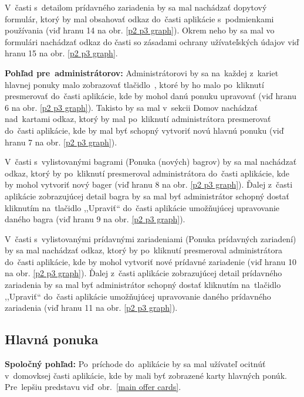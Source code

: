 V~časti s~detailom prídavného zariadenia by sa mal nachádzať dopytový formulár, ktorý by mal obsahovať odkaz do~časti aplikácie s~podmienkami používania (viď hranu 14 na obr. \ref{p2 p3 graph}). Okrem neho by sa mal vo formulári nachádzať odkaz do časti so zásadami ochrany užívateľských údajov viď hranu 15 na obr. \ref{p2 p3 graph}.

\textbf{Pohľad pre~administrátorov:} Administrátorovi by sa na~každej z~kariet hlavnej ponuky malo zobrazovať tlačidlo~, ktoré by ho malo po~kliknutí presmerovať do~časti aplikácie, kde by mohol danú ponuku upravovať (viď hranu 6 na obr. \ref{p2 p3 graph}). Takisto by sa mal v~sekcii Domov nachádzať nad~kartami odkaz, ktorý by mal po~kliknutí administrátora presmerovať do~časti aplikácie, kde by mal byť schopný vytvoriť novú hlavnú ponuku (viď hranu 7 na obr. \ref{p2 p3 graph}).

V~časti s~vylistovanými bagrami (Ponuka (nových) bagrov) by sa mal nachádzať odkaz, ktorý by po~kliknutí presmeroval administrátora do~časti aplikácie, kde by mohol vytvoriť nový bager (viď hranu 8 na obr. \ref{p2 p3 graph}). Ďalej z~časti aplikácie zobrazujúcej detail bagra by sa mal byť administrátor schopný dostať kliknutím na~tlačidlo ,,Upraviť`` do~časti aplikácie umožňujúcej upravovanie daného bagra (viď hranu 9 na obr. \ref{p2 p3 graph}).

V~časti s~vylistovanými prídavnými zariadeniami (Ponuka prídavných zariadení) by sa mal nachádzať odkaz, ktorý by po~kliknutí presmeroval administrátora do~časti aplikácie, kde by mohol vytvoriť nové prídavné zariadenie (viď hranu 10 na obr. \ref{p2 p3 graph}). Ďalej z~časti aplikácie zobrazujúcej detail prídavného zariadenia by sa mal byť administrátor schopný dostať kliknutím na~tlačidlo ,,Upraviť`` do~časti aplikácie umožňujúcej upravovanie daného prídavného zariadenia (viď hranu 11 na obr. \ref{p2 p3 graph}).

\subsection{Hlavná ponuka}
\label{hlavna ponuka}

\textbf{Spoločný pohľad:} Po~príchode do~aplikácie by sa mal užívateľ ocitnúť v~domovksej časti aplikácie, kde by mali byť zobrazené karty hlavných ponúk. Pre~lepšiu predstavu viď~obr.~\ref{main offer cards}.

